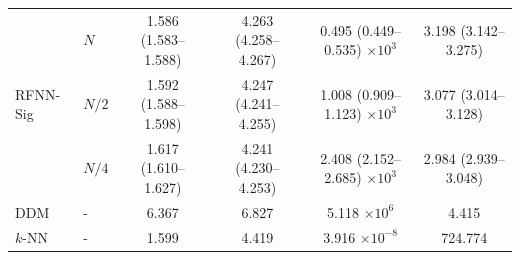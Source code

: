 \documentclass{article}
\begin{document}
\begin{table}[htbp]
{\begin{tabular}{@{}llcccc@{}}
\multirow{3}{*}{RFNN-Sig} 
&	$N$	     & 1.586 (1.583--1.588) & 4.263 (4.258--4.267) & 0.495 (0.449--0.535) $\times 10^{3}$ & 3.198 (3.142--3.275) \\
&	$N/2$	 & 1.592 (1.588--1.598) & 4.247 (4.241--4.255) & 1.008 (0.909--1.123) $\times 10^{3}$ & 3.077 (3.014--3.128) \\
&	$N/4$	 & 1.617 (1.610--1.627) & 4.241 (4.230--4.253) & 2.408 (2.152--2.685) $\times 10^{3}$ & 2.984 (2.939--3.048) \\
\midrule

DDM  &	-	& 6.367 & 6.827 & 5.118 $\times 10^{6}$ & 4.415 \\
$k$-NN &	-	& 1.599 & 4.419 & 3.916 $\times 10^{-8}$ & 724.774 \\

\bottomrule
\end{tabular}%
}
\end{table}
\end{document}
